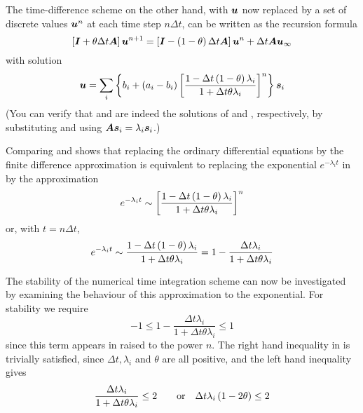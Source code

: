 The time-difference scheme  on the other hand, with
$\vect{u}$ now replaced by a set of discrete values $\vect{u}^{n}$ at each time
step $n\Delta t$, can be written as the recursion formula
\begin{equation}
  \sqbrac{\matr{I}+\theta \Delta t\matr{A}}\vect{u}^{n+1} = \sqbrac{\matr{I}-\pbrac{1-\theta} 
    \Delta t\matr{A}}\vect{u}^{n} +\Delta t\matr{A} \vect{u}_{\infty}
  \label{eqn:recform}
\end{equation}
with solution
\begin{equation}
  \vect{u}=\dsuml{i}{} \bbrac{b_{i} + \pbrac{a_{i}- b_{i}}\sqbrac{
      \dfrac{1 - \Delta t\pbrac{1-\theta}\lambda_{i}}{1 + \Delta t \theta 
        \lambda_{i}}}^{n}}\vect{s}_{i}
  \label{eqn:wsol}
\end{equation}
(You can verify that  and  are indeed the
solutions of  and , respectively, by
substituting and using $\matr{A}\vect{s}_{i} = \lambda_{i}\vect{s}_{i}$.)

Comparing  and  shows that replacing the
ordinary differential equations  by the finite difference
approximation  is equivalent to replacing the exponential
$e^{-\lambda_{i}t}$ in  by the approximation
\begin{equation}
  e^{-\lambda_{i}t} \sim \left[ \dfrac{1- \Delta t \left( 1-\theta \right)\lambda_{i}}
    {1 + \Delta t \theta \lambda_{i}} \right]^{n}
  \label{eqn:approx}
\end{equation}
or, with $t = n\Delta t$,
\begin{equation}
  e^{-\lambda_{i}t} \sim \dfrac{1 - \Delta t\left( 1-\theta \right)\lambda_{i}}{
    1 + \Delta t\theta \lambda_{i}}=1-\dfrac{\Delta t \lambda_{i}}
  {1+\Delta t \theta \lambda_{i}}
  \label{eqn:approx2}
\end{equation}

The stability of the numerical time integration scheme can now be investigated
by examining the behaviour of this approximation to the exponential. For
stability we require
\begin{equation}
  -1 \leq 1 - \dfrac{\Delta t \lambda_{i}}{1 + \Delta t \theta 
    \lambda_{i}} \leq 1
  \label{eqn:stab}
\end{equation}
since this term appears in  raised to the power $n$. The right
hand inequality in  is trivially satisfied, since $\Delta
t,\lambda_{i}$ and $\theta $ are all positive, and the left hand inequality
gives
\begin{equation}
  \dfrac{\Delta t \lambda_{i}}{1 + \Delta t \theta \lambda_{i}} \leq 2 \qquad 
  \text{or} \quad \Delta t \lambda_{i} \left( 1-2\theta \right) \leq 2
\label{eqn:LHineq}
\end{equation}

